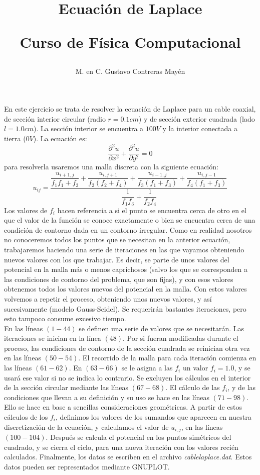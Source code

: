 \documentclass[12pt]{article}
\title{Ecuación de Laplace \\\begin{Large} Curso de Física Computacional\end{Large}}
\author{M. en C. Gustavo Contreras Mayén}
\date{ }
\begin{document}
\maketitle
En este ejercicio se trata de resolver la ecuación de Laplace para un cable coaxial,
de sección interior circular (radio $r=0.1 cm$) y de sección exterior cuadrada (lado
$l=1.0 cm$). La sección interior se encuentra a $100 V$ y la interior conectada a tierra ($0 V$). La ecuación es:
\begin{equation}
\frac{\partial^{2}u}{\partial x^{2}}+\frac{\partial^{2}u}{\partial y^{2}}=0
\end{equation}
para resolverla usaremos una malla discreta con la siguiente ecuación:
\begin{equation}
u_{ij}= \dfrac{\dfrac{u_{i+1,j}}{f_{1}f_{1}+f_{3}} + \dfrac {u_{i,j+1}}{f_{2}(f_{2}+f_{4})} + \dfrac {u_{i-1,j}}{f_{3}(f_{1}+f_{3})} +\dfrac{u_{i,j-1}}{f_{4}(f_{1}+f_{3})}}{\dfrac{1}{f_{1}f_{3}}+\dfrac{1}{f_{2}f_{4}}}
\end{equation}
Los valores de $f_{i}$ hacen referencia a si el punto se encuentra cerca de otro en el que el valor de la función se conoce exactamente o bien se encuentra cerca de una condición de contorno dada en un contorno irregular. Como en realidad nosotros no conoceremos todos los puntos que se necesitan en la anterior ecuación, trabajaremos haciendo una serie de iteraciones en las que vayamos obteniendo nuevos valores con los que trabajar. Es decir, se parte de unos valores del potencial en la malla más o menos caprichosos (salvo los que se corresponden a las condiciones de contorno del problema, que son fijas), y con esos valores obtenemos todos los valores nuevos del potencial en la malla. Con estos valores volvemos a repetir el proceso, obteniendo unos nuevos valores, y así sucesivamente (modelo Gauss-Seidel). Se requerirán bastantes iteraciones, pero esto tampoco consume excesivo tiempo.
\\
En las líneas $(1-44)$ se definen una serie de valores que se necesitarán. Las iteraciones se inician en la línea $(48)$. Por si fueran modificadas durante el proceso, las condiciones de contorno de la sección cuadrada se reinician otra vez en las líneas $(50-54)$. El recorrido de la malla para cada iteración comienza en las líneas $(61-62)$. En $(63-66)$ se le asigna a las $f_{i}$ un valor $f_{i}=1.0$, y se usará ese valor si no se indica lo contrario. Se excluyen los cálculos en el interior de la sección circular mediante las líneas $(67-68)$. El cálculo de las $f_{i}$, y de las condiciones que llevan a su definición y su uso se hace en las líneas $(71-98)$.
Ello se hace en base a sencillas consideraciones geométricas. A partir de estos cálculos de los $f_{i}$, definimos los valores de los sumandos que aparecen en nuestra discretización de la ecuación, y calculamos el valor de $u_{i,j}$, en las líneas $(100-104)$. Después se calcula el potencial en los puntos simétricos del cuadrado, y se cierra el ciclo, para una nueva iteración con los valores recién calculados. Finalmente, los datos se escriben en el archivo \textit{cablelaplace.dat}. Estos datos pueden ser representados mediante GNUPLOT.
\end{document}
